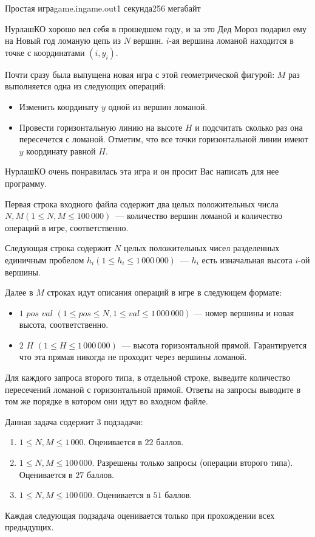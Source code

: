 \begin{problem}{Простая игра}{game.in}{game.out}{1 секунда}{256 мегабайт}

НурлашКО хорошо вел себя в прошедшем году, и за это Дед Мороз подарил ему на Новый год ломаную цепь из $N$ вершин. $i$-ая вершина ломаной находится в точке с координатами $(i, y_i)$.

Почти сразу была выпущена новая игра с этой геометрической фигурой: $M$ раз выполняется одна из следующих операций: 
\begin{itemize}  
   \item Изменить координату $y$ одной из вершин ломаной.
   \item Провести горизонтальную линию на высоте $H$ и подсчитать сколько раз она пересечется с ломаной. Отметим, что все точки горизонтальной линии имеют $y$ координату равной $H$.
\end{itemize}

НурлашКО очень понравилась эта игра и он просит Вас написать для нее программу.

\InputFile
Первая строка входного файла содержит два целых положительных числа $N, M (1 \leq N, M \leq 100\,000)$~--- количество вершин ломаной и количество операций в игре, соответственно.

Следующая строка содержит $N$ целых положительных чисел разделенных единичным пробелом $h_i (1 \leq h_i \leq 1\,000\,000)$~--- $h_i$ есть изначальная высота $i$-ой вершины.

Далее в $M$ строках идут описания операций в игре в следующем формате:
\begin{itemize}
\item $1$ $pos$ $val$ $(1 \leq pos \leq N, 1 \leq val \leq 1\,000\,000)$ --- номер вершины и новая высота, соответственно.
\item $2$ $H$ $(1 \leq H \leq 1\,000\,000)$~--- высота горизонтальной прямой. Гарантируется что эта прямая никогда не проходит через вершины ломаной.
\end{itemize}

\OutputFile
Для каждого запроса второго типа, в отдельной строке, выведите количество пересечений ломаной с горизонтальной прямой. Ответы на запросы выводите в том же порядке в котором они идут во входном файле.

\Scoring
Данная задача содержит 3 подзадачи:
\begin{enumerate}
\item $1 \leq N, M \leq 1\,000$. Оценивается в $22$ баллов.
\item $1 \leq N, M \leq 100\,000$. Разрешены только запросы (операции второго типа). Оценивается в $27$ баллов.
\item $1 \leq N, M \leq 100\,000$. Оценивается в $51$ баллов.
\end{enumerate}

Каждая следующая подзадача оценивается только при прохождении всех предыдущих.

\Example

\begin{example}
%
\end{example}

\end{problem}

